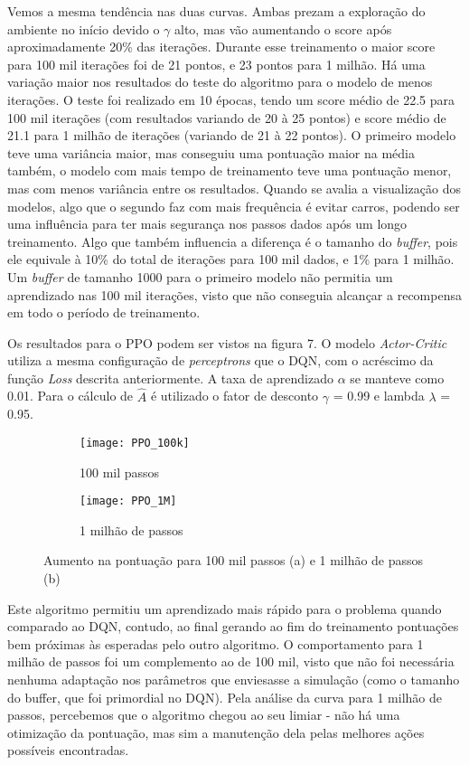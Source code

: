 \documentclass[letterpaper]{article} %
\begin{document}
Vemos a mesma tendência nas duas curvas. Ambas prezam a exploração do ambiente no início devido o $\gamma$ alto, mas vão aumentando o score após aproximadamente 20\% das iterações. Durante esse treinamento o maior score para 100 mil iterações foi de 21 pontos, e 23 pontos para 1 milhão. Há uma variação maior nos resultados do teste do algoritmo para o modelo de menos iterações. O teste foi realizado em 10 épocas, tendo um score médio de 22.5 para 100 mil iterações (com resultados variando de 20 à 25 pontos) e score médio de 21.1 para 1 milhão de iterações (variando de 21 à 22 pontos). O primeiro modelo teve uma variância maior, mas conseguiu uma pontuação maior na média também, o modelo com mais tempo de treinamento teve uma pontuação menor, mas com menos variância entre os resultados. Quando se avalia a visualização dos modelos, algo que o segundo faz com mais frequência é evitar carros, podendo ser uma influência para ter mais segurança nos passos dados após um longo treinamento. Algo que também influencia a diferença é o tamanho do \textit{buffer}, pois ele equivale à 10\% do total de iterações para 100 mil dados, e 1\% para 1 milhão. Um \textit{buffer} de tamanho 1000 para o primeiro modelo não permitia um aprendizado nas 100 mil iterações, visto que não conseguia alcançar a recompensa em todo o período de treinamento.


Os resultados para o PPO podem ser vistos na figura 7. O modelo \textit{Actor-Critic} utiliza a mesma configuração de \textit{perceptrons} que o DQN, com o acréscimo da função \textit{Loss} descrita anteriormente. A taxa de aprendizado $\alpha$ se manteve como 0.01. Para o cálculo de $\hat{A}$ é utilizado o fator de desconto $\gamma$ = 0.99 e lambda $\lambda$ = 0.95.

\begin{figure}[h]
     \begin{subfigure}[h]{0.2\textwidth}
         \centering
         \texttt{[image: PPO\_100k]}
         \caption{100 mil passos}
     \end{subfigure}
     \hfill
     \begin{subfigure}[h]{0.2\textwidth}
         \texttt{[image: PPO\_1M]}
         \caption{1 milhão de passos}
     \end{subfigure}
        \caption{Aumento na pontuação para 100 mil passos (a) e 1 milhão de passos (b)}
\end{figure}

Este algoritmo permitiu um aprendizado mais rápido para o problema quando comparado ao DQN, contudo, ao final gerando ao fim do treinamento pontuações bem próximas às esperadas pelo outro algoritmo. O comportamento para 1 milhão de passos foi um complemento ao de 100 mil, visto que não foi necessária nenhuma adaptação nos parâmetros que enviesasse a simulação (como o tamanho do buffer, que foi primordial no DQN). Pela análise da curva para 1 milhão de passos, percebemos que o algoritmo chegou ao seu limiar - não há uma otimização da pontuação, mas sim a manutenção dela pelas melhores ações possíveis encontradas.
\end{document}
